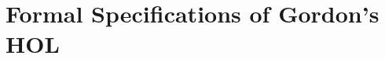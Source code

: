 \documentclass[10pt,titlepage]{book}
\newcommand{\ignore}[1]{}
\newcommand{\resetnotes}{%
  \ifnum\value{endnote}>0%
  \theendnotes%
  \setcounter{endnote}{0}%
  \else%
  \fi%
}
\begin{document}
\ignore{

\chapter{Synthetic Epistemology and Foundational Abstract Semantics}


\resetnotes

\chapter{The Evolution of Declarative Knowledge}\label{EDK}


\resetnotes

\chapter{A Philosophical Kernel 2}


\resetnotes

\chapter{A Philosophical Kernel 3}


\resetnotes

\chapter{A Philosophical Kernel}\label{PK}


\resetnotes

\chapter{The Fundamental Triple Trichotomy}\label{FTT}


\resetnotes
}%

\appendix
\ignore{
\chapter{The Philosophy of Rudolf Carnap}\label{PRC}


\resetnotes
}%

\chapter{Formal Specifications of Gordon's HOL}\label{HOLspecs}
\end{document}
